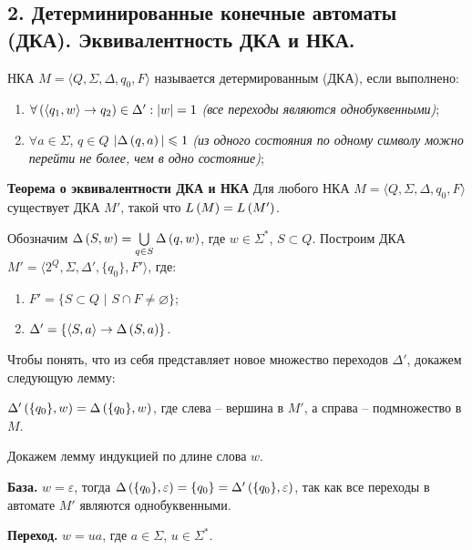 \subsection{2. Детерминированные конечные автоматы (ДКА). Эквивалентность ДКА и НКА.}

\Def НКА $M = \langle Q, \Sigma, \Delta, q_0, F \rangle$ называется детермированным (ДКА), если выполнено:

\begin{enumerate}
    \item $\forall \left({\langle q_1, w \rangle \rightarrow q_2}\right) \in \Delta' : |w| = 1$ \newline\textit{(все переходы являются однобуквенными)};
    \item $\forall a \in \Sigma$, $q \in Q$ $|\Delta \left({q, a}\right)| \leqslant 1$ \newline\textit{(из одного состояния по одному символу можно перейти не более, чем в одно состояние)};
\end{enumerate}

\textbf{Теорема о эквивалентности ДКА и НКА} Для любого НКА $M = \langle Q, \Sigma, \Delta, q_0, F \rangle$ существует ДКА $M'$, такой что $L \left({M}\right) = L \left({M'}\right)$.

\noindent \Proof Обозначим $\Delta \left({S, w}\right) = \bigcup \limits_{q \in S} \Delta \left({q, w}\right)$, где $w \in \Sigma^*$, $S \subset Q$. Построим ДКА $M' = \langle 2^Q, \Sigma, \Delta', \{ q_0 \}, F' \rangle$, где:
\begin{enumerate}
    \item $F' = \{ S \subset Q \,\,|\,\, S \cap F \neq \varnothing \}$;
    \item $\Delta' = \{ \langle S, a \rangle \rightarrow \Delta \left({S, a}\right) \}$.
\end{enumerate}

\noindent Чтобы понять, что из себя представляет новое множество переходов $\Delta'$, докажем следующую лемму:

\Lemma $\Delta' \left({\{ q_0 \}, w}\right) = \Delta \left({\{ q_0 \}, w}\right)$, где слева -- вершина в $M'$, а справа -- подмножество в $M$.

Докажем лемму индукцией по длине слова $w$.

\textbf{База.} $w = \varepsilon$, тогда $\Delta \left({\{ q_0 \}, \varepsilon}\right) = \{ q_0 \} = \Delta' \left({\{ q_0 \}, \varepsilon}\right)$, так как все переходы в автомате $M'$ являются однобуквенными.

\textbf{Переход.} $w = ua$, где $a \in \Sigma$, $u \in \Sigma^*$.

